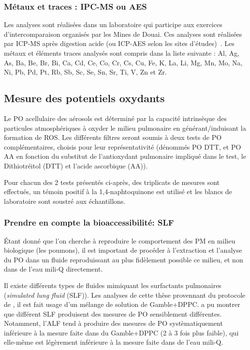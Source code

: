 \subsubsection{Métaux et traces : IPC-MS ou AES}%
\label{ssub:métaux_et_traces}

Les analyses sont réalisées dans un laboratoire qui
participe aux exercices d’intercomparaison organisés par les Mines de Douai. Ces analyses
sont réalisées par ICP-MS après digestion acide (ou ICP-AES selon les sites
d'études)~\autocite{allemanPM102010,mbengueSizedistributed2014,cenAmbient2005}.
Les métaux et éléments traces analysés sont compris dans la liste suivante : Al, Ag, As,
Ba, Be, Br, Bi, Ca, Cd, Ce, Co, Cr, Cs, Cu, Fe, K, La, Li, Mg, Mn, Mo, Na, Ni, Pb, Pd, Pt,
Rb, Sb, Sc, Se, Sn, Sr, Ti, V, Zn et Zr.

\subsection{Mesure des potentiels oxydants}%
\label{sub:potentiels_oxydants}

Le PO acellulaire des aérosols est déterminé par la capacité intrinsèque des particules
atmosphériques à oxyder le milieu pulmonaire en générant/induisant la formation de ROS.
Les différents filtres seront soumis à deux tests de PO complémentaires, choisis pour
leur représentativité (dénommés PO DTT, et PO AA en fonction du substitut de
l’antioxydant pulmonaire impliqué dans le test, le Dithiotréitol (DTT) et l’acide
ascorbique (AA)). 

Pour chacun des 2 tests présentés ci-après, des triplicats de mesures sont effectués, un
témoin positif à la 1,4-naphtoquinone est utilisé et les blancs de laboratoire sont
soustré aux échantillons.

\subsubsection{Prendre en compte la bioaccessibilité: SLF}%
\label{sub:prendre_en_compte_la_bioaccessibilite_slf}

Étant donné que l'on cherche à reproduire le comportement des PM en milieu biologique
(les poumons), il est important de procéder à l'extraction et l'analyse du PO dans un
fluide reproduissant au plus fidèlement possible ce milieu, et non dans de l'eau mili-Q
directement.

Il existe différents types de fluides mimiquant les surfactants pulmonaires (\textit{simulated
lung fluid} (SLF)). Les analyses de cette thèse provennant du protocole de
\textcite{calasPollution2017}, il est fait usage d'un mélange de solution de Gamble+DPPC.
\textcite{calasImportance2017} a pu montrer que différent SLF produisent des mesures de PO
sensiblement différentes. Notamment, l'ALF tend à produire des mesures de PO
systèmatiquement inférieure à la mesure faite dans du Gamble+DPPC (2 à 3 fois plus
faible), qui elle-même est légèrement inférieure à la mesure faite dans de l'eau mili-Q.

